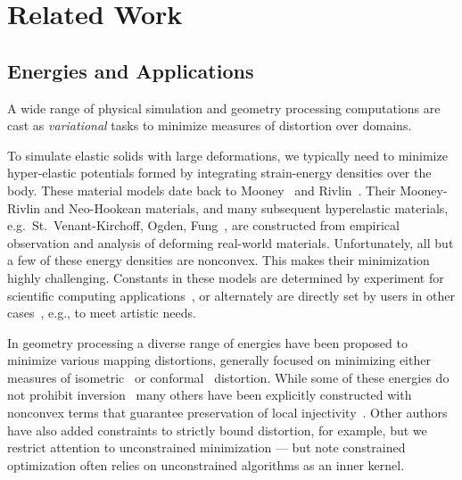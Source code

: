 \section{Related Work}

\subsection{Energies and Applications}

A wide range of physical simulation and geometry processing
computations are cast as \emph{variational} tasks to minimize
measures of distortion over domains.

To simulate elastic solids with large deformations,
we typically need to minimize hyper-elastic potentials formed
by integrating strain-energy densities over the body. These
material models date back to Mooney~ and
Rivlin~.  Their Mooney-Rivlin and
Neo-Hookean materials, and many subsequent hyperelastic materials,
e.g.~St.~Venant-Kirchoff, Ogden,  Fung~\cite{Bonet:1998:ASO}, are
constructed from empirical observation and
analysis of deforming real-world materials. Unfortunately, all but
a few of these energy densities are nonconvex. This makes their
minimization highly challenging. Constants in these models are
determined by experiment for scientific computing
applications~\cite{Ogden:1972:LDI}, or alternately are directly set
by users in other cases~\cite{Xu:2015:NMD}, e.g., to meet artistic
needs.

In geometry processing a diverse range of energies have 
been proposed to minimize various mapping distortions, 
generally focused on minimizing either measures of
isometric~\cite{Sorkine:2007:ARA,Chao:2010:ASG,Smith:2015:BPW,Aigerman:2015:Seamless,Liu:2008:ALG}
or
conformal~\cite{Hormann:2000:MIPS,Levy:2002:LSC,Desbrun:2002:IPO,Benchen:2008:CFB,Mullen:2008:SCP,Weber:2012:CEQ}
distortion. While some of these energies do not prohibit
inversion~\cite{Sorkine:2007:ARA,Chao:2010:ASG,Levy:2002:LSC,Desbrun:2002:IPO}
many others have been explicitly constructed with nonconvex terms
that guarantee preservation of local
injectivity~\cite{Hormann:2000:MIPS,Aigerman:2015:Seamless,Smith:2015:BPW}.
Other authors have also added constraints to strictly bound distortion, for example,
but we restrict attention to unconstrained minimization --- but note constrained
optimization often relies on unconstrained algorithms as an inner kernel.

